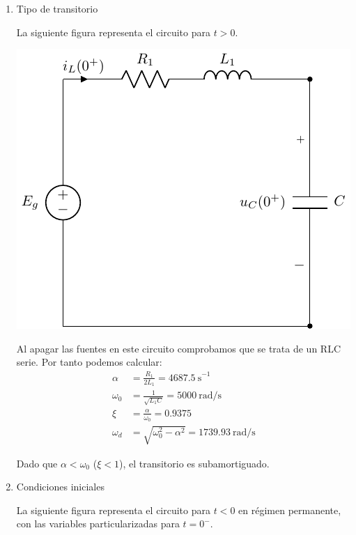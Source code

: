 \begin{enumerate}

\item Tipo de transitorio

La siguiente figura representa el circuito para $t > 0$.

\includegraphics{figuras/E1_RLC_0+.pdf}

Al apagar las fuentes en este circuito comprobamos que se trata de un RLC serie. Por tanto podemos calcular:
\begin{align*}
  \alpha &= \frac{R_1}{2L_1} = \SI{4687.5}{\second}^{-1}\\[3pt]
  \omega_0 &= \frac{1}{\sqrt{L_1C}} = \SI{5000}{\radian\per\second}\\[3pt]
  \xi &= \frac{\alpha}{\omega_0} = 0.9375\\[3pt]
  \omega_d &= \sqrt{\omega_0^2 - \alpha^2} = \SI{1739.93}{\radian\per\second}
\end{align*}

\vspace{1mm}
Dado que $\alpha < \omega_0$ ($\xi < 1$), el transitorio es subamortiguado.

\vspace{2mm}

\item Condiciones iniciales

  La siguiente figura representa el circuito para $t < 0$ en régimen permanente, con las variables particularizadas para $t = 0^-$.


\end{enumerate}
